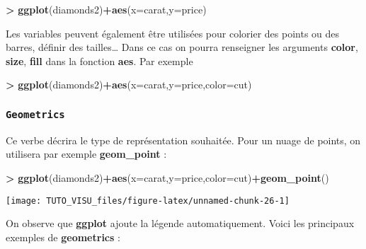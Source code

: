 \documentclass[]{article}
\newenvironment{Shaded}{\begin{snugshade}}{\end{snugshade}}
\newcommand{\DataTypeTok}[1]{\textcolor[rgb]{0.13,0.29,0.53}{#1}}
\newcommand{\KeywordTok}[1]{\textcolor[rgb]{0.13,0.29,0.53}{\textbf{#1}}}
\newcommand{\NormalTok}[1]{#1}
\newcommand{\OperatorTok}[1]{\textcolor[rgb]{0.81,0.36,0.00}{\textbf{#1}}}
\newcommand{\StringTok}[1]{\textcolor[rgb]{0.31,0.60,0.02}{#1}}
\theoremstyle{definition}
\theoremstyle{definition}
\theoremstyle{definition}
\theoremstyle{remark}
\begin{document}
\begin{Shaded}
\begin{Highlighting}[]
\OperatorTok{>}\StringTok{ }\KeywordTok{ggplot}\NormalTok{(diamonds2)}\OperatorTok{+}\KeywordTok{aes}\NormalTok{(}\DataTypeTok{x=}\NormalTok{carat,}\DataTypeTok{y=}\NormalTok{price)}
\end{Highlighting}
\end{Shaded}

Les variables peuvent également être utilisées pour colorier des points ou des barres, définir des tailles\ldots{} Dans ce cas on pourra renseigner les arguments \textbf{color}, \textbf{size}, \textbf{fill} dans la fonction \textbf{aes}. Par exemple

\begin{Shaded}
\begin{Highlighting}[]
\OperatorTok{>}\StringTok{ }\KeywordTok{ggplot}\NormalTok{(diamonds2)}\OperatorTok{+}\KeywordTok{aes}\NormalTok{(}\DataTypeTok{x=}\NormalTok{carat,}\DataTypeTok{y=}\NormalTok{price,}\DataTypeTok{color=}\NormalTok{cut)}
\end{Highlighting}
\end{Shaded}

\hypertarget{geometrics}{%
\subsubsection{\texorpdfstring{\texttt{Geometrics}}{Geometrics}}\label{geometrics}}

Ce verbe décrira le type de représentation souhaitée. Pour un nuage de points, on utilisera par exemple \textbf{geom\_point} :

\begin{Shaded}
\begin{Highlighting}[]
\OperatorTok{>}\StringTok{ }\KeywordTok{ggplot}\NormalTok{(diamonds2)}\OperatorTok{+}\KeywordTok{aes}\NormalTok{(}\DataTypeTok{x=}\NormalTok{carat,}\DataTypeTok{y=}\NormalTok{price,}\DataTypeTok{color=}\NormalTok{cut)}\OperatorTok{+}\KeywordTok{geom_point}\NormalTok{()}
\end{Highlighting}
\end{Shaded}

\begin{center}\texttt{[image: TUTO\_VISU\_files/figure-latex/unnamed-chunk-26-1]} \end{center}

On observe que \textbf{ggplot} ajoute la légende automatiquement. Voici les principaux exemples de \textbf{geometrics} :
\end{document}
